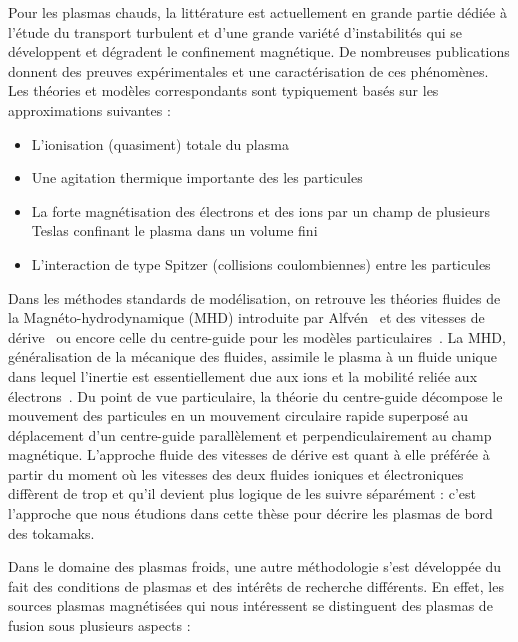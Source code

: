 \begin{refsection}
Pour les plasmas chauds, la littérature est actuellement en grande partie dédiée
à l'étude du transport turbulent et d'une grande variété d'instabilités qui
se développent et dégradent le confinement magnétique. De nombreuses
publications donnent des preuves expérimentales et une caractérisation de ces
phénomènes. Les théories et modèles correspondants sont typiquement basés sur
les approximations suivantes :

\begin{itemize}
  \item L'ionisation (quasiment) totale du plasma
  \item Une agitation thermique importante des les particules
  \item La forte magnétisation des électrons et des ions par un champ de
  plusieurs Teslas confinant le plasma dans un volume fini
  \item L'interaction de type Spitzer (collisions coulombiennes) entre les
  particules
\end{itemize}

Dans les méthodes standards de modélisation, on retrouve les théories fluides de
la Magnéto-hydrodynamique
 (MHD) introduite
par Alfvén~\parencite{Alfven} et des vitesses de dérive~\parencite{SarazinPhD}
ou encore celle du centre-guide pour les modèles
particulaires~\parencite{Taylor,Lee,Garbet10}.
La MHD, généralisation de la mécanique des fluides, assimile le plasma à un fluide unique dans lequel
l'inertie est essentiellement due aux ions et la mobilité reliée aux
électrons~\parencite{Rax}. Du point de vue particulaire, la
théorie du centre-guide décompose le mouvement des particules en un mouvement
circulaire rapide superposé au déplacement d'un centre-guide parallèlement et
perpendiculairement au champ magnétique. L'approche fluide des vitesses de
dérive est quant à elle préférée à partir du moment où les vitesses des deux fluides
ioniques et électroniques diffèrent de trop et qu'il devient plus logique de les
suivre séparément : c'est l'approche que nous étudions dans cette thèse pour
décrire les plasmas de bord des tokamaks.

Dans le domaine des plasmas froids, une autre méthodologie s'est développée du
fait des conditions de plasmas et des intérêts de recherche
différents. En effet, les sources plasmas magnétisées qui nous intéressent
se distinguent des plasmas de fusion sous plusieurs aspects :


\end{refsection}
